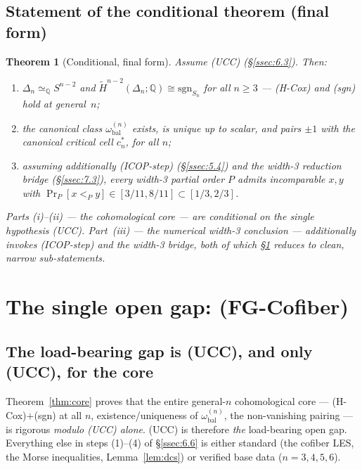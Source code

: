 \documentclass[11pt,reqno]{amsart}
\theoremstyle{plain}
\newtheorem{theorem}{Theorem}[section]
\theoremstyle{definition}
\newcommand{\Hred}{\widetilde H}
\newcommand{\sgn}{\mathrm{sgn}}
\newcommand{\Q}{\mathbb{Q}}
\newcommand{\omegabal}[1]{\omega_{\mathrm{bal}}^{(#1)}}
\newcommand{\cstar}[1]{c^{*}_{#1}}
\newcommand{\UCC}{\textup{(UCC)}}
\newcommand{\ICOPstep}{\textup{(ICOP-step)}}
\begin{document}
\subsection{Statement of the conditional theorem (final form)}\label{ssec:6.7}
\begin{theorem}[Conditional, final form]\label{thm:final}
Assume \UCC{} \textup{(\S\ref{ssec:6.3})}. Then:
\begin{enumerate}[leftmargin=2em,label=\textup{(\roman*)}]
  \item $\Delta_n\simeq_{\Q}S^{n-2}$ and
        $\Hred^{n-2}(\Delta_n;\Q)\cong\sgn_{S_n}$ for all $n\ge3$ ---
        \textup{(H-Cox)} and \textup{(sgn)} hold at general~$n$;
  \item the canonical class $\omegabal n$ exists, is unique up to
        scalar, and pairs $\pm1$ with the canonical critical cell
        $\cstar n$, for all $n$;
  \item assuming additionally \ICOPstep{} \textup{(\S\ref{ssec:5.4})}
        and the width-3 reduction bridge \textup{(\S\ref{ssec:7.3})},
        every width-3 partial order $P$ admits incomparable $x,y$ with
        $\Pr_P[x<_Py]\in[3/11,8/11]\subset[1/3,2/3]$.
\end{enumerate}
Parts \textup{(i)--(ii)} --- the cohomological core --- are conditional
on the \emph{single} hypothesis \UCC. Part~\textup{(iii)} --- the
numerical width-3 conclusion --- additionally invokes \ICOPstep{} and the
width-3 bridge, both of which \S\ref{sec:opengap} reduces to clean,
narrow sub-statements.
\end{theorem}

\section{The single open gap: (FG-Cofiber)}\label{sec:opengap}

\subsection{The load-bearing gap is (UCC), and only (UCC), for the core}\label{ssec:7.1}
Theorem~\ref{thm:core} proves that the entire general-$n$ cohomological
core --- (H-Cox)$+$(sgn) at all $n$, existence/uniqueness of
$\omegabal n$, the non-vanishing pairing --- is rigorous \emph{modulo
\UCC{} alone}. \UCC{} is therefore \emph{the} load-bearing open gap.
Everything else in steps (1)--(4) of \S\ref{ssec:6.6} is either standard
(the cofiber LES, the Morse inequalities, Lemma~\ref{lem:dcs}) or
verified base data ($n=3,4,5,6$).
\end{document}
